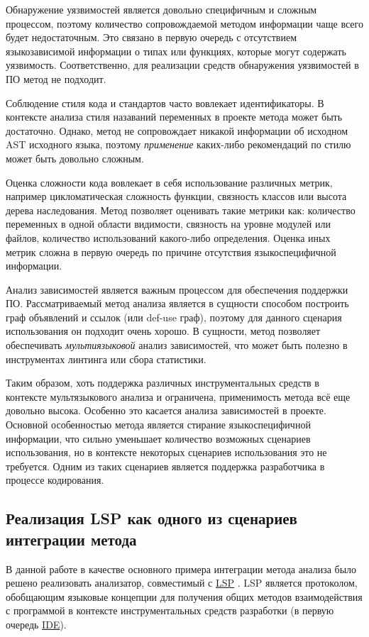 Обнаружение уязвимостей является довольно специфичным и сложным процессом, поэтому
количество сопровождаемой методом информации чаще всего будет недостаточным. Это связано
в первую очередь с отсутствием языкозависимой информации о типах или функциях, которые
могут содержать уязвимость. Соответственно, для реализации средств обнаружения уязвимостей в ПО
метод не подходит.

Соблюдение стиля кода и стандартов часто вовлекает идентификаторы. В контексте
анализа стиля назаваний переменных в проекте метода может быть достаточно. Однако, метод
не сопровождает никакой информации об исходном AST исходного языка, поэтому \textit{применение}
каких-либо рекомендаций по стилю может быть довольно сложным.

Оценка сложности кода вовлекает в себя использование различных метрик, например цикломатическая сложность
функции, связность классов или высота дерева наследования. Метод позволяет оценивать такие метрики как:
количество переменных в одной области видимости, связность на уровне модулей или файлов, количество
использований какого-либо определения. Оценка иных метрик сложна в первую очередь по причине отсутствия
языкоспецифичной информации.

Анализ зависимостей является важным процессом для обеспечения поддержки ПО. Рассматриваемый
метод анализа является в сущности способом построить граф объявлений и ссылок (или def-use граф), поэтому
для данного сценария использования он подходит очень хорошо. В сущности, метод позволяет обеспечивать
\textit{мультиязыковой} анализ зависимостей, что может быть полезно в инструментах линтинга или
сбора статистики.

Таким образом, хоть поддержка различных инструментальных средств в контексте мультязыкового анализа и
ограничена, применимость метода всё еще довольно высока. Особенно это касается анализа зависимостей
в проекте. Основной особенностью метода является стирание языкоспецифичной информации, что
сильно уменьшает количество возможных сценариев использования, но в контексте некоторых сценариев использования
это не требуется. Одним из таких сценариев является поддержка разработчика в процессе кодирования.

\subsection{Реализация LSP как одного из сценариев интеграции метода}

В данной работе в качестве основного примера интеграции метода анализа было решено реализовать
анализатор, совместимый с \hyperlink{LSP}{LSP} \cite{LSP-spec}. LSP является протоколом, обобщающим языковые концепции для получения общих
методов взаимодействия с программой в контексте инструментальных средств разработки (в первую очередь \hyperlink{IDE}{IDE}).


